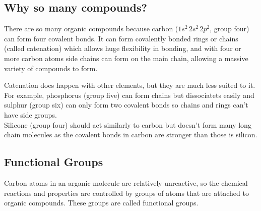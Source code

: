\documentclass[a4paper, 12pt]{article}
\begin{document}
	\subsection{Why so many compounds?}
		There are so many organic compounds because carbon ($1s^2 \, 2s^2 \, 2p^2$, group four) can form four covalent bonds. It can form covalently bonded rings or chains (called catenation) which allows huge flexibility in bonding, and with four or more carbon atoms side chains can form on the main chain, allowing a massive variety of compounds to form. \\
		\par
		Catenation does happen with other elements, but they are much less suited to it. For example, phosphorus (group five) can form chains but dissociatets easily and sulphur (group six) can only form two covalent bonds so chains and rings can't have side groups. \\
		Silicone (group four) should act similarly to carbon but doesn't form many long chain molecules as the covalent bonds in carbon are stronger than those is silicon. 
		
	\subsection{Functional Groups}
		Carbon atoms in an arganic molecule are relatively unreactive, so the chemical reactions and properties are controlled by groups of atoms that are attached to organic compounds. These groups are called functional groups. 
\end{document}

